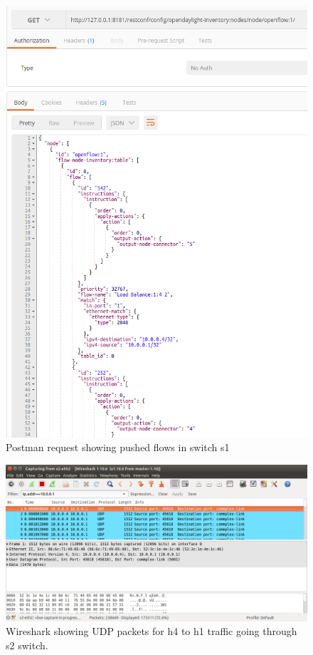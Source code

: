 \begin{figure}[h!]
 \centering
 \includegraphics[width=\linewidth]{images/loadbalancing/flows.png}
 \caption{Postman request showing pushed flows in switch s1}
 \label{fig:flows}
\end{figure}

\begin{figure}[h!]
 \centering
 \includegraphics[width=\linewidth]{images/loadbalancing/s2fromh1.png}
 \caption{Wireshark showing UDP packets for h4 to h1 traffic going through s2 switch.}
 \label{fig:s2fromh1}
\end{figure}

